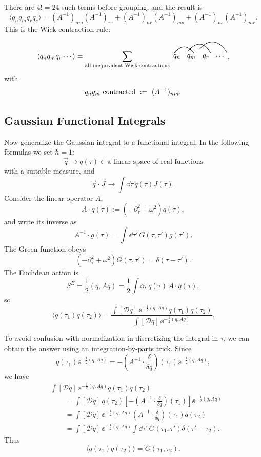 There are $4!=24$ such terms before grouping, and the result is
\[
  \langle q_nq_mq_rq_s\rangle
  =
  (A^{-1})_{nm}(A^{-1})_{rs}
  +(A^{-1})_{nr}(A^{-1})_{ms}
  +(A^{-1})_{ns}(A^{-1})_{mr}.
\]
This is the Wick contraction rule:
\[
  \langle q_nq_mq_r\cdots\rangle
  =
  \sum_{\text{all inequivalent Wick contractions}}
  \begin{tikzpicture}[baseline=-0.55ex,scale=0.65]
    \node at (0,0) {$q_n$};
    \node at (1.1,0) {$q_m$};
    \node at (2.2,0) {$q_r$};
    \node at (3.3,0) {$\cdots$};
    \draw[line width=0.7pt] (-0.2,0.28) .. controls (0.35,0.9) and (0.75,0.9) .. (1.3,0.28);
    \draw[line width=0.7pt] (0.85,0.42) .. controls (1.45,1.15) and (2.1,1.15) .. (2.55,0.28);
    \draw[line width=0.7pt] (1.7,0.55) .. controls (2.35,1.35) and (3.2,1.35) .. (3.8,0.28);
  \end{tikzpicture},
\]
with
\[
  q_nq_m\ \hbox{contracted}\ :=\ (A^{-1})_{nm}.
\]

\subsection{Gaussian Functional Integrals}

Now generalize the Gaussian integral to a functional integral. In the following
formulas we set $\hbar=1$:
\[
  \vec q\longrightarrow q(\tau)
  \in
  \text{a linear space of real functions}
\]
with a suitable measure, and
\[
  \vec q\cdot\vec J
  \longrightarrow
  \int\dd\tau\,q(\tau)J(\tau).
\]
Consider the linear operator $A$,
\[
  A\cdot q(\tau):=\left(-\partial_\tau^2+\omega^2\right)q(\tau),
\]
and write its inverse as
\[
  A^{-1}\cdot g(\tau)
  =
  \int\dd\tau'\,G(\tau,\tau')g(\tau').
\]
The Green function obeys
\[
  \left(-\partial_\tau^2+\omega^2\right)G(\tau,\tau')
  =
  \delta(\tau-\tau').
\]
The Euclidean action is
\[
  S^E
  =
  \frac12(q,Aq)
  =
  \frac12\int\dd\tau\,q(\tau)\,A\cdot q(\tau),
\]
so
\[
  \langle q(\tau_1)q(\tau_2)\rangle
  =
  \frac{
    \int[\mathcal Dq]\,
    \ee^{-\frac12(q,Aq)}
    q(\tau_1)q(\tau_2)
  }{
    \int[\mathcal Dq]\,
    \ee^{-\frac12(q,Aq)}
  }.
\]

To avoid confusion with normalization in discretizing the integral in $\tau$,
we can obtain the answer using an integration-by-parts trick. Since
\[
  q(\tau_1)\ee^{-\frac12(q,Aq)}
  =
  -\left(A^{-1}\cdot\frac{\delta}{\delta q}\right)(\tau_1)
  \ee^{-\frac12(q,Aq)},
\]
we have
\[
\begin{aligned}
  &\int[\mathcal Dq]\,
  \ee^{-\frac12(q,Aq)}q(\tau_1)q(\tau_2)
  \\
  &\qquad =
  \int[\mathcal Dq]\,
  q(\tau_2)
  \left[
    -\left(A^{-1}\cdot\frac{\delta}{\delta q}\right)(\tau_1)
  \right]
  \ee^{-\frac12(q,Aq)}
  \\
  &\qquad =
  \int[\mathcal Dq]\,
  \ee^{-\frac12(q,Aq)}
  \left(A^{-1}\cdot\frac{\delta}{\delta q}\right)(\tau_1)
  q(\tau_2)
  \\
  &\qquad =
  \int[\mathcal Dq]\,
  \ee^{-\frac12(q,Aq)}
  \int\dd\tau'\,G(\tau_1,\tau')\delta(\tau'-\tau_2).
\end{aligned}
\]
Thus
\[
  \langle q(\tau_1)q(\tau_2)\rangle
  =
  G(\tau_1,\tau_2).
\]

